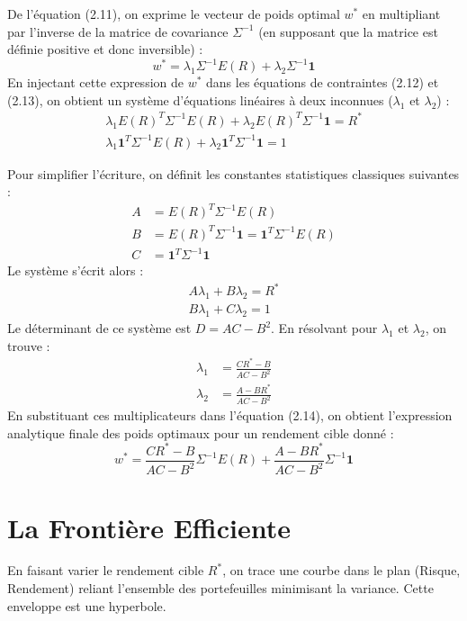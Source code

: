 De l'équation (2.11), on exprime le vecteur de poids optimal $w^*$ en multipliant par l'inverse de la matrice de covariance $\Sigma^{-1}$ (en supposant que la matrice est définie positive et donc inversible) :
\begin{equation}
    w^* = \lambda_1 \Sigma^{-1} E(R) + \lambda_2 \Sigma^{-1} \mathbf{1}
\end{equation}
En injectant cette expression de $w^*$ dans les équations de contraintes (2.12) et (2.13), on obtient un système d'équations linéaires à deux inconnues ($\lambda_1$ et $\lambda_2$) :
\begin{align}
    \lambda_1 E(R)^T \Sigma^{-1} E(R) + \lambda_2 E(R)^T \Sigma^{-1} \mathbf{1} = R^* \\
    \lambda_1 \mathbf{1}^T \Sigma^{-1} E(R) + \lambda_2 \mathbf{1}^T \Sigma^{-1} \mathbf{1} = 1
\end{align}

Pour simplifier l'écriture, on définit les constantes statistiques classiques suivantes :
\begin{align}
    A &= E(R)^T \Sigma^{-1} E(R) \\
    B &= E(R)^T \Sigma^{-1} \mathbf{1} = \mathbf{1}^T \Sigma^{-1} E(R) \\
    C &= \mathbf{1}^T \Sigma^{-1} \mathbf{1}
\end{align}
Le système s'écrit alors :
\begin{align}
    A \lambda_1 + B \lambda_2 = R^* \\
    B \lambda_1 + C \lambda_2 = 1
\end{align}
Le déterminant de ce système est $D = AC - B^2$. En résolvant pour $\lambda_1$ et $\lambda_2$, on trouve :
\begin{align}
    \lambda_1 &= \frac{C R^* - B}{AC - B^2} \\
    \lambda_2 &= \frac{A - B R^*}{AC - B^2}
\end{align}
En substituant ces multiplicateurs dans l'équation (2.14), on obtient l'expression analytique finale des poids optimaux pour un rendement cible donné :
\begin{equation}
    w^* = \frac{C R^* - B}{AC - B^2} \Sigma^{-1} E(R) + \frac{A - B R^*}{AC - B^2} \Sigma^{-1} \mathbf{1}
\end{equation}

\section{La Frontière Efficiente}
En faisant varier le rendement cible $R^*$, on trace une courbe dans le plan (Risque, Rendement) reliant l'ensemble des portefeuilles minimisant la variance. Cette enveloppe est une hyperbole. 

